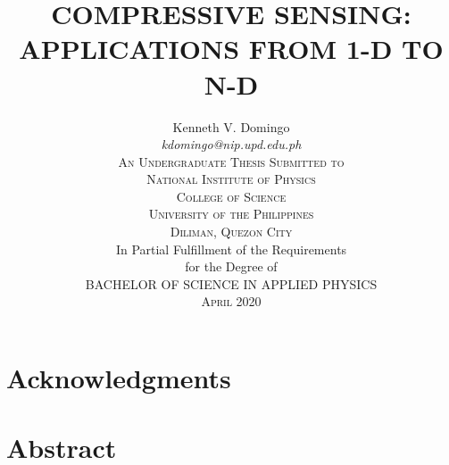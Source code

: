 \documentclass[12pt,oneside]{report}
\begin{document}

\title{
	\Large\uppercase\expandafter{Compressive sensing: Applications from 1-D to N-D
	}
}

\author{
	\large\rm\expandafter{
	Kenneth V. Domingo 
	}\\
	\large\textit{\expandafter{
		kdomingo@nip.upd.edu.ph
	}}\\
	\textsc{An Undergraduate Thesis Submitted to}\\
	\textsc{National Institute of Physics}\\
	\textsc{College of Science}\\
	\textsc{University of the Philippines} \\
	\textsc{Diliman, Quezon City}\\
	\vskip0.25in
	\rm In Partial Fulfillment of the Requirements\\
	\rm for the Degree of\\
	\rm\uppercase\expandafter{Bachelor of Science}
	\rm\uppercase{in}
	\rm\uppercase\expandafter{Applied Physics}\\
	\textsc\expandafter{April 2020}
}

\maketitle
\thispagestyle{titlestyle}

\chapter*{Acknowledgments}

\chapter*{Abstract}

\tableofcontents
\listoffigures
\listoftables

\cleardoublepage
{}










\end{document}
